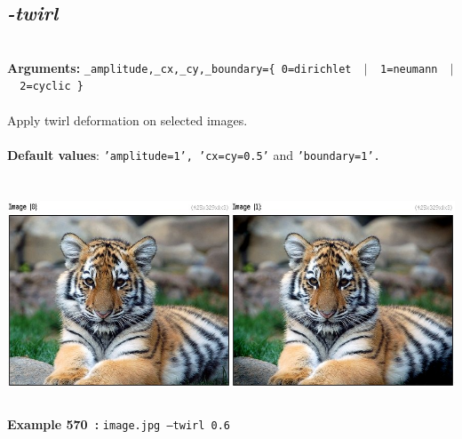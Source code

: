 \documentclass[a4paper,11pt,twoside]{book}
\begin{document}
\subsection{\emph{-twirl} }\vspace*{-0.5em}
~\\\textbf{Arguments: } 
{\small \texttt{\_amplitude,\_cx,\_cy,\_boundary=\{ 0=dirichlet ~$|$~ 1=neumann ~$|$~ 2=cyclic \}}}\\~\\
Apply twirl deformation on selected images.
~\\~\\\textbf{Default values}: {\small \texttt{'amplitude=1', 'cx=cy=0.5'} and \texttt{'boundary=1'.}}
\begin{center}\includegraphics[keepaspectratio=true,height=7cm,width=\textwidth]{img/gmic_def570.jpg}\\
{\footnotesize \textbf{Example 570~:} \texttt{image.jpg --twirl 0.6}}
\end{center}
\end{document}
